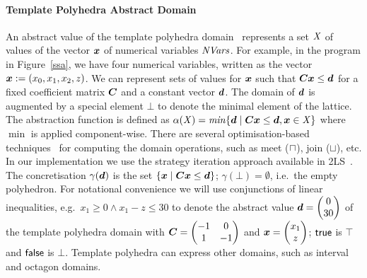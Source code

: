 \paragraph{\textbf{Template Polyhedra Abstract Domain}}
%
An abstract value of the template polyhedra domain~\cite{sriram}
represents a set $\mathit{X}$ of values of the vector ${\boldsymbol {x}}$ of numerical variables $\mathit{NVars}$. For
example, in the program in Figure~\ref{ssa}, we have four numerical
variables, written as the vector ${\boldsymbol {x}}:=(x_0,x_1,x_2,z)$.  We can
represent sets of values for ${\boldsymbol {x}}$ such that
${\boldsymbol C}{\boldsymbol {x}}\leq{\boldsymbol {d}}$ for a fixed coefficient matrix ${\boldsymbol C}$
and a constant vector ${\boldsymbol {d}}$. The domain of ${\boldsymbol {d}}$ is augmented
by a special element $\bot$ to denote the minimal element of the
lattice.
%
The abstraction function is defined as $\alpha(\mathit{X}) = \mathit{min} \{{\boldsymbol {d}}\mid
{\boldsymbol C}{\boldsymbol {x}}\leq{\boldsymbol {d}}, {\boldsymbol {x}}\in \mathit{X}\}$ where $\min$ is applied
component-wise. There are several optimisation-based
techniques~\cite{sriram,GS07b,BJKS15} for computing the domain
operations, such as meet ($\sqcap$), join ($\sqcup$), etc. In our implementation we
use the strategy iteration approach available in 2LS~\cite{BJKS15}.
%
The concretisation $\gamma({\boldsymbol {d}})$ is the set $\{{\boldsymbol {x}}\mid
{\boldsymbol C}{\boldsymbol {x}}\leq{\boldsymbol {d}}\}$; $\gamma(\bot)=\emptyset$, i.e.\ the empty polyhedron.
%
For notational convenience we will use conjunctions of linear
inequalities, e.g.\ $x_1\geq 0 \wedge x_1-z\leq 30$ to denote the
abstract value $\vec{\numabsval}=\vecv{0}{30}$ of the template polyhedra domain
with $\mat{C}=\qmat{-1}{0}{1}{-1}$ and $\vec{\numvar}=\vecv{x_1}{z}$;
$\mathsf{true}$ is $\top$ and $\mathsf{false}$ is $\bot$.  Template polyhedra can
express other domains, such as interval and octagon domains.


